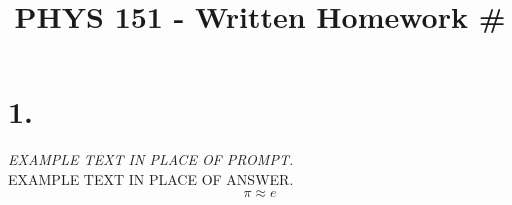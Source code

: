 \documentclass[12pt]{article}
\title{\vspace{-2\baselineskip}PHYS 151 - Written Homework \#\HOMEWORKNUM}
\author{\NAME}
\date{\DATE}
\begin{document}
\maketitle


\section*{1.}
\textit{EXAMPLE TEXT IN PLACE OF PROMPT.} \\[\baselineskip]
EXAMPLE TEXT IN PLACE OF ANSWER.
\begin{equation*}
	\pi \approx e
\end{equation*}
\end{document}
